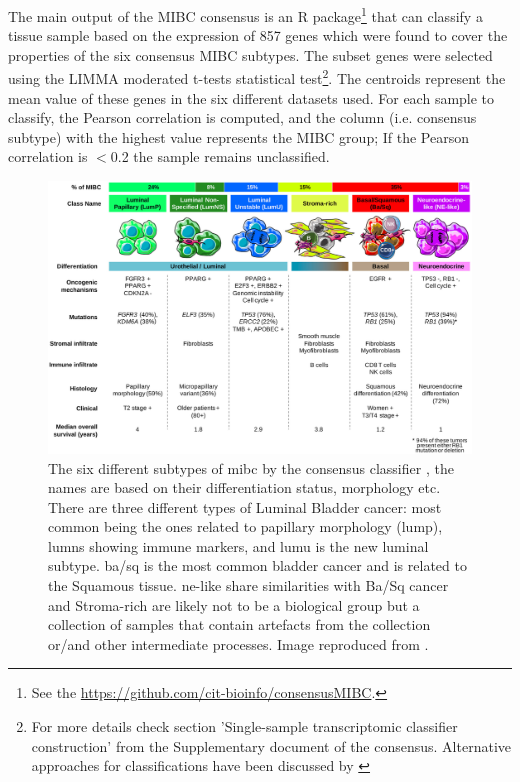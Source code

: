 The main output of the MIBC consensus is an R package\footnote{See the \url{https://github.com/cit-bioinfo/consensusMIBC}.} that can classify a tissue sample based on the expression of 857 genes which were found to cover the properties of the six consensus MIBC subtypes. The subset genes were selected using the LIMMA moderated t-tests statistical test\footnote{For more details check section 'Single-sample transcriptomic classifier construction' from the Supplementary document of the consensus. Alternative approaches for classifications have been discussed by \citet{Eriksson2022-vw}}. The centroids represent the mean value of these genes in the six different datasets used. For each sample to classify, the Pearson correlation is computed, and the column (i.e. consensus subtype) with the highest value represents the MIBC group; If the Pearson correlation is $<$0.2 the sample remains unclassified. 

\begin{figure}[!t]   
\centering
\includegraphics[width=1.0\textwidth,height=1.0\textheight,keepaspectratio]{Sections/Lit_review/Resources/2020_consensus_subtypes.jpg}
  \caption[Summary of the MIBC consensus subgroups]{The six different subtypes of \acrfull{mibc} by the consensus classifier \citep{Kamoun2020-tj}, the names are based on their differentiation status, morphology etc. There are three different types of Luminal Bladder cancer: most common being the ones related to papillary morphology (\acrfull{lump}), \acrfull{lumns} showing immune markers, and \acrfull{lumu} is the new luminal subtype. \acrfull{ba/sq} is the most common bladder cancer and is related to the Squamous tissue. \acrfull{ne-like} share similarities with Ba/Sq cancer and Stroma-rich are likely not to be a biological group but a collection of samples that contain artefacts from the collection or/and other intermediate processes. Image reproduced from \citep{Kamoun2020-tj}.
}
\label{fig:lit:2020_consens}
\end{figure}
\FloatBarrier


